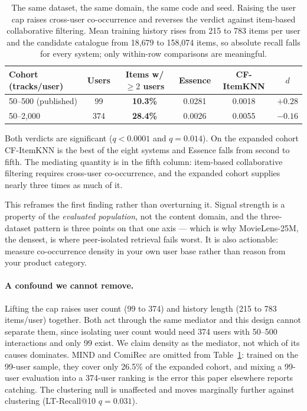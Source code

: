 \documentclass[runningheads]{llncs}
\begin{document}
\begin{table}[tb]
\caption{The same dataset, the same domain, the same code and seed. Raising the user cap
raises cross-user co-occurrence and reverses the verdict against item-based collaborative
filtering. Mean training history rises from 215 to 783 items per user and the candidate
catalogue from 18{,}679 to 158{,}074 items, so absolute recall falls for every system;
only within-row comparisons are meaningful.}\label{tab:cohort}
\centering
\small
\begin{tabular}{@{}lccccc@{}}
\toprule
Cohort (tracks/user) & Users & Items w/ $\geq 2$ users & Essence & CF-ItemKNN & $d$ \\
\midrule
50--500 (published) & 99 & \textbf{10.3\%} & 0.0281 & 0.0018 & $\mathbf{+0.28}$ \\
50--2{,}000 & 374 & \textbf{28.4\%} & 0.0026 & 0.0055 & $\mathbf{-0.16}$ \\
\bottomrule
\end{tabular}
\end{table}

Both verdicts are significant ($q < 0.0001$ and $q = 0.014$). On the expanded cohort
CF-ItemKNN is the best of the eight systems and Essence falls from second to fifth. The
mediating quantity is in the fifth column: item-based collaborative filtering requires
cross-user co-occurrence, and the expanded cohort supplies nearly three times as much of it.

This reframes the first finding rather than overturning it. Signal strength is a property
of the \emph{evaluated population}, not the content domain, and the three-dataset pattern
is three points on that one axis --- which is why MovieLens-25M, the densest, is where
peer-isolated retrieval fails worst. It is also actionable: measure co-occurrence density
in your own user base rather than reason from your product category.

\paragraph{A confound we cannot remove.} Lifting the cap raises user count (99 to 374) and
history length (215 to 783 items/user) together. Both act through the same mediator and
this design cannot separate them, since isolating user count would need 374 users with
50--500 interactions and only 99 exist. We claim density as the mediator, not which of its
causes dominates. MIND and ComiRec are omitted from
Table~\ref{tab:cohort}: trained on the 99-user sample, they cover only 26.5\% of the
expanded cohort, and mixing a 99-user evaluation into a 374-user ranking is the error this
paper elsewhere reports catching. The clustering null is unaffected and moves marginally
further against clustering (LT-Recall@10 $q = 0.031$).
\end{document}
